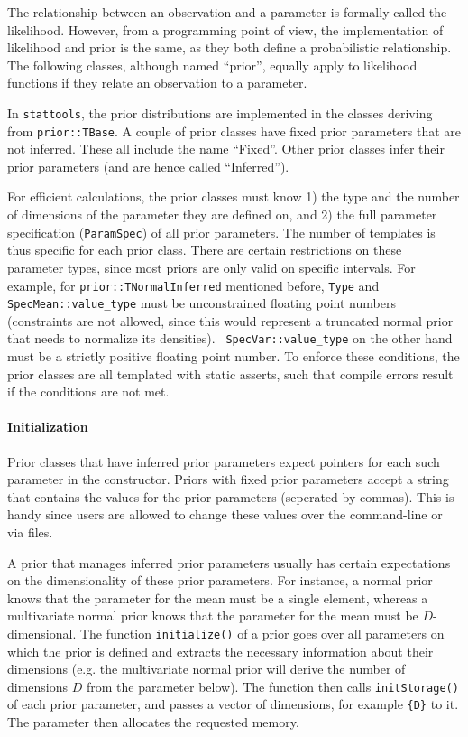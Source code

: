 \documentclass[a4paper,11pt]{article}
\def\stattools{\texttt{stattools}}
\newcommand{\class}[1]{\texttt{#1}}
\newcommand{\pubfunc}[1]{\texttt{#1()}}
\newcommand{\type}[1]{\texttt{#1}}
\begin{document}
The relationship between an observation and a parameter is formally called the likelihood. However, from a programming point of view, the implementation of likelihood and prior is the same, as they both define a probabilistic relationship. The following classes, although named ``prior'', equally apply to likelihood functions if they relate an observation to a parameter.

In \stattools{}, the prior distributions are implemented in the classes deriving from \class{prior::TBase}. A couple of prior classes have fixed prior parameters that are not inferred. These all include the name ``Fixed''. Other prior classes infer their prior parameters (and are hence called ``Inferred'').

For efficient calculations, the prior classes must know 1) the type and the number of dimensions of the parameter they are defined on, and 2) the full parameter specification (\class{ParamSpec}) of all prior parameters. The number of templates is thus specific for each prior class. There are certain restrictions on these parameter types, since most priors are only valid on specific intervals. For example, for \class{prior::TNormalInferred} mentioned before, \type{Type} and \type{SpecMean::value\_type} must be unconstrained floating point numbers (constraints are not allowed, since this would represent a truncated normal prior that needs to normalize its densities). \type{ SpecVar::value\_type} on the other hand must be a strictly positive floating point number. To enforce these conditions, the prior classes are all templated with static asserts, such that compile errors result if the conditions are not met.

\paragraph{Initialization}

Prior classes that have inferred prior parameters expect pointers for each such parameter in the constructor. Priors with fixed prior parameters accept a string that contains the values for the prior parameters (seperated by commas). This is handy since users are allowed to change these values over the command-line or via files.

A prior that manages inferred prior parameters usually has certain expectations on the dimensionality of these prior parameters. For instance, a normal prior knows that the parameter for the mean must be a single element, whereas a multivariate normal prior knows that the parameter for the mean must be $D$-dimensional. The function \pubfunc{initialize} of a prior goes over all parameters on which the prior is defined and extracts the necessary information about their dimensions (e.g. the multivariate normal prior will derive the number of dimensions $D$ from the parameter below). The function then calls \pubfunc{initStorage} of each prior parameter, and passes a vector of dimensions, for example \texttt{\{D\}} to it. The parameter then allocates the requested memory.
\end{document}
